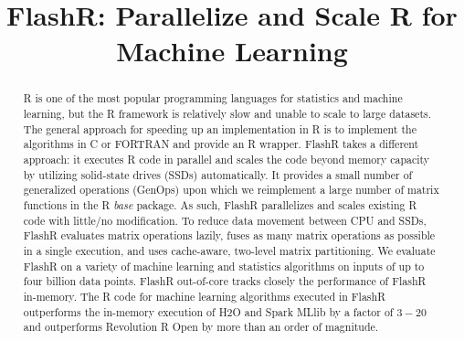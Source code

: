 \documentclass[sigplan,10pt,review,anonymous]{acmart}\settopmatter{printfolios=true}
\begin{document}
\title{FlashR: Parallelize and Scale R for Machine Learning}






\begin{abstract}
R is one of the most popular programming languages for statistics and machine
learning, but the R framework is relatively slow and unable to scale to large
datasets. The general approach for speeding up an implementation in R is to
implement the algorithms in C or FORTRAN and provide an R wrapper. FlashR takes
a different approach: it executes R code in parallel and scales the code beyond
memory capacity by utilizing solid-state drives (SSDs) automatically. It
provides a small number of generalized 
operations (GenOps) upon which we reimplement a large number of
matrix functions in the R \textit{base} package. As such, FlashR parallelizes
and scales existing R code with little/no modification. To reduce data movement
between CPU and SSDs, FlashR evaluates matrix operations lazily, fuses
as many matrix operations as possible in a single execution, and uses cache-aware,
two-level matrix partitioning.
We evaluate FlashR on a variety of machine learning and statistics algorithms 
on inputs of up to four billion data points.
FlashR out-of-core tracks closely the performance of FlashR in-memory.
The R code for machine learning algorithms executed in FlashR
outperforms the in-memory execution of H2O and Spark MLlib by a factor of
$3-20$ and outperforms Revolution R Open by more than an order of magnitude.
\end{abstract}
\end{document}
